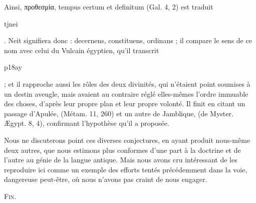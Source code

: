 \documentclass[a4paper, 11pt, oneside]{article}
\begin{document}
Ainsi, προθεσμία, tempus certum et definitum (Gal. 4, 2) est traduit \begin{coptic}tjnei\end{coptic}. Neit signifiera donc : decernens, constituens, ordinans ; il compare le sens de ce nom avec celui du Vulcain égyptien, qu'il transcrit \begin{coptic}p18ay\end{coptic} ; et il rapproche aussi les rôles des deux divinités, qui n'étaient point soumises à un destin aveugle, mais avaient au contraire réglé elles-mêmes l'ordre immuable des choses, d'après leur propre plan et leur propre volonté. Il finit en citant un passage d'Apulée, (Métam. 11, 260) et un autre de Jamblique, (de Myster. Ægypt. 8, 4), confirmant l'hypothèse qu'il a proposée.

Nous ne discuterons point ces diverses conjectures, en ayant produit nous-même deux autres, que nous estimons plus conformes d'une part à la doctrine et de l'autre au génie de la langue antique. Mais nous avons cru intéressant de les reproduire ici comme un exemple des efforts tentés précédemment dans la voie, dangereuse peut-être, où nous n'avons pas craint de nous engager.
\begin{center}
\textsc{Fin.}
\end{center}
\end{document}

